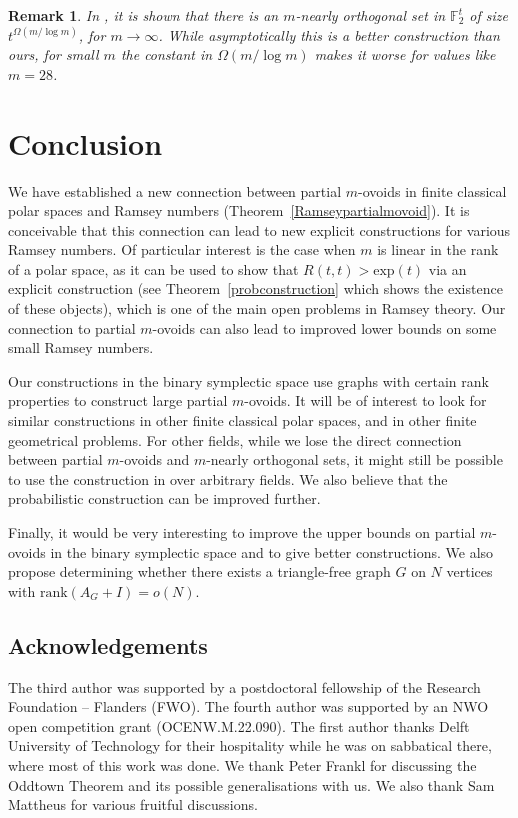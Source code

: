 \documentclass[a4paper,11pt]{amsproc}
\theoremstyle{plain}
\newtheorem{Remark} [Theorem] {Remark}
\theoremstyle{definition}
\newcommand{\<}{\langle}
\renewcommand{\>}{\rangle} %
\begin{document}
\begin{Remark}
    In \cite{Chawin24}, it is shown that there is an $m$-nearly orthogonal set in $\mathbb{F}_2^t$ of size $t^{\Omega(m/\log m)}$, for $m \rightarrow \infty$. 
    While asymptotically this is a better construction than ours, for small $m$ the constant in $\Omega(m/\log m)$ makes it worse for values like $m = 28$. 
\end{Remark}



\section{Conclusion}

We have established a new connection between partial $m$-ovoids in finite classical polar spaces and Ramsey numbers (Theorem~\ref{Ramseypartialmovoid}). 
It is conceivable that this connection can lead to new explicit constructions for various Ramsey numbers. 
Of particular interest is the case when $m$ is linear in the rank of a polar space, as it can be used to show that $R(t, t) > \mathrm{exp}(t)$ via an explicit construction (see Theorem~\ref{probconstruction} which shows the existence of these objects), which is one of the main open problems in Ramsey theory.
Our connection to partial $m$-ovoids can also lead to improved lower bounds on some small Ramsey numbers. 

Our constructions in the binary symplectic space use graphs with certain rank properties to construct large partial $m$-ovoids. 
It will be of interest to look for similar constructions in other finite classical polar spaces, and in other finite geometrical problems.
For other fields, while we lose the direct connection between partial $m$-ovoids and $m$-nearly orthogonal sets, it might still be possible to use the construction in \cite{Haviv} over arbitrary fields.
We also believe that the probabilistic construction can be improved further. 

Finally, it would be very interesting to improve the upper bounds on partial $m$-ovoids in the binary symplectic space and to give better constructions. 
We also propose determining whether there exists a triangle-free graph $G$ on $N$ vertices with $\mathrm{rank}(A_G + I) = o(N)$.


\subsection*{Acknowledgements}

The third author was supported by a 
postdoctoral fellowship of the Research Foundation -- Flanders (FWO).
The fourth author was supported by an NWO open competition grant (OCENW.M.22.090). 
The first author thanks Delft University of Technology for their hospitality while he was
on sabbatical there, where most of this work was done.
We thank Peter Frankl for discussing the Oddtown Theorem
and its possible generalisations with us.
We also thank Sam Mattheus for various fruitful discussions. 
\end{document}
